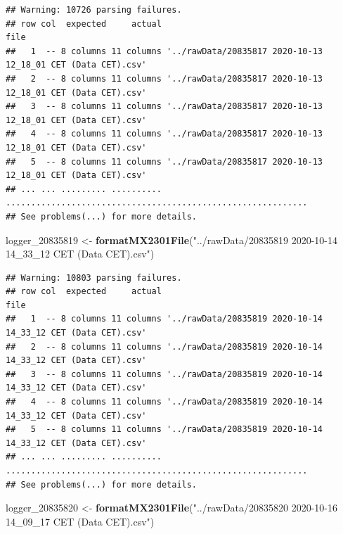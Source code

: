 \documentclass[]{article}
\newenvironment{Shaded}{\begin{snugshade}}{\end{snugshade}}
\newcommand{\DecValTok}[1]{\textcolor[rgb]{0.00,0.00,0.81}{#1}}
\newcommand{\KeywordTok}[1]{\textcolor[rgb]{0.13,0.29,0.53}{\textbf{#1}}}
\newcommand{\NormalTok}[1]{#1}
\newcommand{\StringTok}[1]{\textcolor[rgb]{0.31,0.60,0.02}{#1}}
\begin{document}
\begin{verbatim}
## Warning: 10726 parsing failures.
## row col  expected     actual                                                         file
##   1  -- 8 columns 11 columns '../rawData/20835817 2020-10-13 12_18_01 CET (Data CET).csv'
##   2  -- 8 columns 11 columns '../rawData/20835817 2020-10-13 12_18_01 CET (Data CET).csv'
##   3  -- 8 columns 11 columns '../rawData/20835817 2020-10-13 12_18_01 CET (Data CET).csv'
##   4  -- 8 columns 11 columns '../rawData/20835817 2020-10-13 12_18_01 CET (Data CET).csv'
##   5  -- 8 columns 11 columns '../rawData/20835817 2020-10-13 12_18_01 CET (Data CET).csv'
## ... ... ......... .......... ............................................................
## See problems(...) for more details.
\end{verbatim}

\begin{Shaded}
\begin{Highlighting}[]
\NormalTok{logger_}\DecValTok{20835819}\NormalTok{ <-}\StringTok{ }\KeywordTok{formatMX2301File}\NormalTok{(}\StringTok{"../rawData/20835819 2020-10-14 14_33_12 CET (Data CET).csv"}\NormalTok{)}
\end{Highlighting}
\end{Shaded}

\begin{verbatim}
## Warning: 10803 parsing failures.
## row col  expected     actual                                                         file
##   1  -- 8 columns 11 columns '../rawData/20835819 2020-10-14 14_33_12 CET (Data CET).csv'
##   2  -- 8 columns 11 columns '../rawData/20835819 2020-10-14 14_33_12 CET (Data CET).csv'
##   3  -- 8 columns 11 columns '../rawData/20835819 2020-10-14 14_33_12 CET (Data CET).csv'
##   4  -- 8 columns 11 columns '../rawData/20835819 2020-10-14 14_33_12 CET (Data CET).csv'
##   5  -- 8 columns 11 columns '../rawData/20835819 2020-10-14 14_33_12 CET (Data CET).csv'
## ... ... ......... .......... ............................................................
## See problems(...) for more details.
\end{verbatim}

\begin{Shaded}
\begin{Highlighting}[]
\NormalTok{logger_}\DecValTok{20835820}\NormalTok{ <-}\StringTok{ }\KeywordTok{formatMX2301File}\NormalTok{(}\StringTok{"../rawData/20835820 2020-10-16 14_09_17 CET (Data CET).csv"}\NormalTok{)}
\end{Highlighting}
\end{Shaded}
\end{document}
